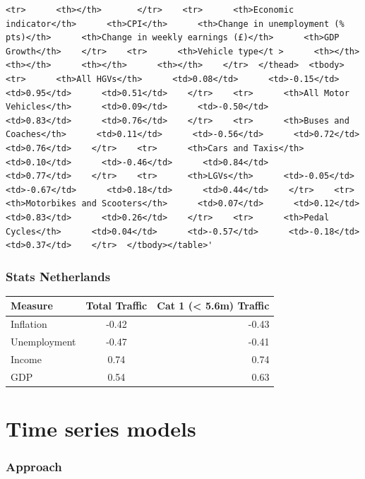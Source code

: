 \documentclass[11pt]{article}
\begin{document}
    \begin{verbatim}
<tr>      <th></th>       </tr>    <tr>      <th>Economic indicator</th>      <th>CPI</th>      <th>Change in unemployment (% pts)</th>      <th>Change in weekly earnings (£)</th>      <th>GDP Growth</th>    </tr>    <tr>      <th>Vehicle type</t >      <th></th>      <th></th>      <th></th>      <th></th>    </tr>  </thead>  <tbody>    <tr>      <th>All HGVs</th>      <td>0.08</td>      <td>-0.15</td>      <td>0.95</td>      <td>0.51</td>    </tr>    <tr>      <th>All Motor Vehicles</th>      <td>0.09</td>      <td>-0.50</td>      <td>0.83</td>      <td>0.76</td>    </tr>    <tr>      <th>Buses and Coaches</th>      <td>0.11</td>      <td>-0.56</td>      <td>0.72</td>      <td>0.76</td>    </tr>    <tr>      <th>Cars and Taxis</th>      <td>0.10</td>      <td>-0.46</td>      <td>0.84</td>      <td>0.77</td>    </tr>    <tr>      <th>LGVs</th>      <td>-0.05</td>      <td>-0.67</td>      <td>0.18</td>      <td>0.44</td>    </tr>    <tr>      <th>Motorbikes and Scooters</th>      <td>0.07</td>      <td>0.12</td>      <td>0.83</td>      <td>0.26</td>    </tr>    <tr>      <th>Pedal Cycles</th>      <td>0.04</td>      <td>-0.57</td>      <td>-0.18</td>      <td>0.37</td>    </tr>  </tbody></table>'
\end{verbatim}

    \subsubsection{Stats Netherlands}\label{stats-netherlands}

\begin{longtable}[c]{@{}lcr@{}}
\toprule
Measure & Total Traffic & Cat 1 (\textless{} 5.6m)
Traffic\tabularnewline
\midrule
\endhead
Inflation & -0.42 & -0.43\tabularnewline
Unemployment & -0.47 & -0.41\tabularnewline
Income & 0.74 & 0.74\tabularnewline
GDP & 0.54 & 0.63\tabularnewline
\bottomrule
\end{longtable}

    \section{Time series models}\label{time-series-models}

    \subsubsection{Approach}\label{approach}
\end{document}
